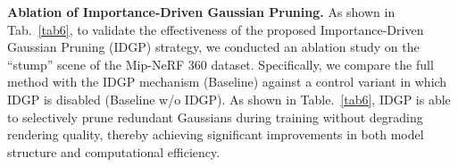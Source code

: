 \noindent\textbf{Ablation of Importance-Driven Gaussian Pruning.}
As shown in Tab.~\ref{tab6}, to validate the effectiveness of the proposed Importance-Driven Gaussian Pruning (IDGP) strategy, we conducted an ablation study on the ``stump'' scene of the Mip-NeRF 360 dataset. 
Specifically, we compare the full method with the IDGP mechanism (Baseline) against a control variant in which IDGP is disabled (Baseline w/o IDGP).
%
%
As shown in Table.~\ref{tab6}, IDGP is able to selectively prune redundant Gaussians during training without degrading rendering quality, thereby achieving significant improvements in both model structure and computational efficiency.

